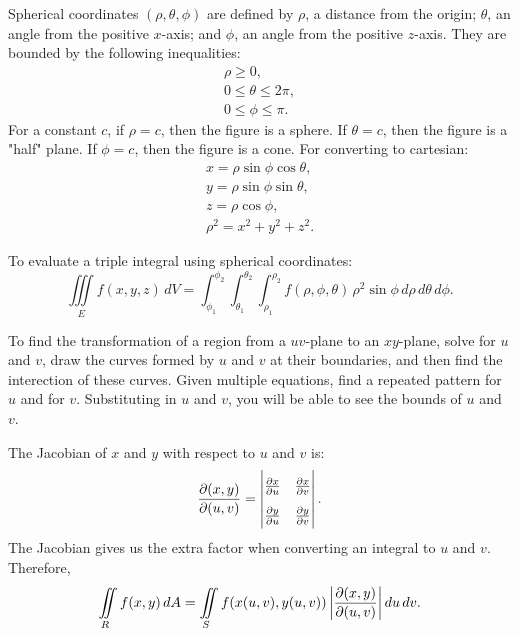\documentclass{article}
\begin{document}
Spherical coordinates $(\rho, \theta, \phi)$ are defined by $\rho$, a distance from the origin;
$\theta$, an angle from the positive $x$-axis; and $\phi$, an angle from the
positive $z$-axis. They are bounded by the following inequalities:
\begin{gather}
    \rho \ge 0 \nonumber, \\
    0 \le \theta \le 2\pi \nonumber, \\
    0 \le \phi \le \pi \nonumber.
\end{gather} 
For a constant $c$, if $\rho = c$, then the figure is a sphere. If $\theta = c$,
then the figure is a "half" plane. If $\phi = c$, then the figure is a cone.
For converting to cartesian:
\begin{gather}
    x = \rho \sin\phi \cos\theta \nonumber, \\
    y = \rho \sin\phi \sin\theta \nonumber, \\
    z = \rho \cos\phi \nonumber, \\
    \rho^2 = x^2 + y^2 + z^2 \nonumber.
\end{gather}

To evaluate a triple integral using spherical coordinates:
\[
    \iiint \limits_E f(x,y,z) \, dV = \int_{\phi_1}^{\phi_2} \int_{\theta_1}^{\theta_2} \int_{\rho_1}^{\rho_2} f(\rho,\phi,\theta) \, \rho^2\sin\phi \, d\rho \, d\theta \, d\phi.
\]

To find the transformation of a region from a $uv$-plane to an $xy$-plane,
solve for $u$ and $v$, draw the curves formed by $u$ and $v$ at their boundaries,
and then find the interection of these curves. Given multiple equations, 
find a repeated pattern for $u$ and for $v$. Substituting in $u$ and $v$, 
you will be able to see the bounds of $u$ and $v$.

The Jacobian of $x$ and $y$ with respect to $u$ and $v$ is:
{\Huge\[\renewcommand\arraystretch{1.6}
\pdv{(x, y)}{(u, v)} = \begin{vmatrix}
    \pdv{x}{u} & \pdv{x}{v} \\[0.5ex]
    \pdv{y}{u} & \pdv{y}{v}
    \end{vmatrix}.
\]}
The Jacobian gives us the extra factor when converting an integral to
$u$ and $v$.
Therefore,
\[
\iint \limits_R f(x,y) \, dA =
\iint \limits_S f(x(u,v), y(u,v)) \, \abs{\pdv{(x, y)}{(u, v)}} \, du \, dv. 
\]
\end{document}
